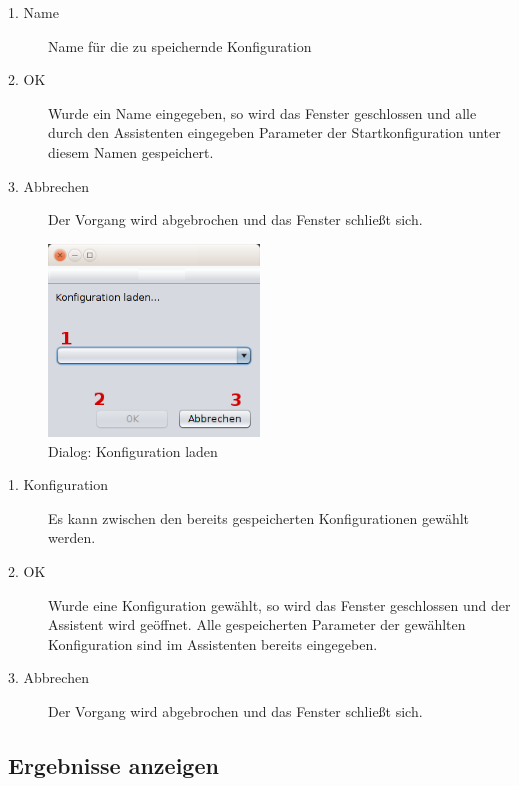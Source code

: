 \begin{description}

\item[1. Name] Name für die zu speichernde Konfiguration
\item[2. OK] Wurde ein Name eingegeben, so wird das Fenster geschlossen und alle durch den Assistenten eingegeben Parameter der Startkonfiguration unter diesem Namen gespeichert.
\item[3. Abbrechen] Der Vorgang wird abgebrochen und das Fenster schließt sich.

\end{description}

\pagebreak

\begin{figure}[hp] 
  \centering
     \includegraphics[width=0.5\textwidth]{GUI_Entwurf/KonfigLaden.png}
  \caption{Dialog: Konfiguration laden}
  \label{fig:Bild6}
\end{figure}

\begin{description}

\item[1. Konfiguration] Es kann zwischen den bereits gespeicherten Konfigurationen gewählt werden.
\item[2. OK] Wurde eine Konfiguration gewählt, so wird das Fenster geschlossen und der Assistent wird geöffnet. Alle gespeicherten Parameter der gewählten Konfiguration sind im Assistenten bereits eingegeben.
\item[3. Abbrechen] Der Vorgang wird abgebrochen und das Fenster schließt sich.

\end{description}

\pagebreak

\subsection{Ergebnisse anzeigen}

